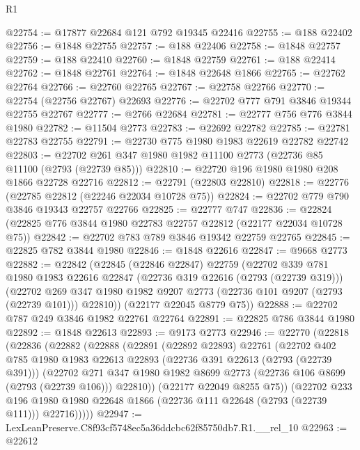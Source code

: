 \begin{lexlean}{R1}
\begin{coremodule}
@22754 := @17877 @22684 @121 @792 @19345 @22416
@22755 := @188 @22402
@22756 := @1848 @22755
@22757 := @188 @22406
@22758 := @1848 @22757
@22759 := @188 @22410
@22760 := @1848 @22759
@22761 := @188 @22414
@22762 := @1848 @22761
@22764 := @1848 @22648 @1866
@22765 := @22762 @22764
@22766 := @22760 @22765
@22767 := @22758 @22766
@22770 := @22754 (@22756 @22767) @22693
@22776 := @22702 @777 @791 @3846 @19344 @22755 @22767
@22777 := @2766 @22684
@22781 := @22777 @756 @776 @3844 @1980
@22782 := @11504 @2773
@22783 := @22692 @22782
@22785 := @22781 @22783 @22755
@22791 := @22730 @775 @1980 @1983 @22619 @22782 @22742
@22803 := @22702 @261 @347 @1980 @1982 @11100 @2773 (@22736 @85 @11100 (@2793 (@22739 @85)))
@22810 := @22720 @196 @1980 @1980 @208 @1866 @22728 @22716
@22812 := @22791 (@22803 @22810)
@22818 := @22776 (@22785 @22812 (@22246 @22034 @10728 @75))
@22824 := @22702 @779 @790 @3846 @19343 @22757 @22766
@22825 := @22777 @747
@22836 := @22824 (@22825 @776 @3844 @1980 @22783 @22757 @22812 (@22177 @22034 @10728 @75))
@22842 := @22702 @783 @789 @3846 @19342 @22759 @22765
@22845 := @22825 @782 @3844 @1980
@22846 := @1848 @22616
@22847 := @9668 @2773
@22882 := @22842
    (@22845
      (@22846 @22847)
      @22759
      (@22702
        @339
        @781
        @1980
        @1983
        @22616
        @22847
        (@22736 @319 @22616 (@2793 (@22739 @319)))
        (@22702 @269 @347 @1980 @1982 @9207 @2773 (@22736 @101 @9207 (@2793 (@22739 @101))) @22810))
      (@22177 @22045 @8779 @75))
@22888 := @22702 @787 @249 @3846 @1982 @22761 @22764
@22891 := @22825 @786 @3844 @1980
@22892 := @1848 @22613
@22893 := @9173 @2773
@22946 := @22770
    (@22818
      (@22836
        (@22882
          (@22888
            (@22891
              (@22892 @22893)
              @22761
              (@22702
                @402
                @785
                @1980
                @1983
                @22613
                @22893
                (@22736 @391 @22613 (@2793 (@22739 @391)))
                (@22702
                  @271
                  @347
                  @1980
                  @1982
                  @8699
                  @2773
                  (@22736 @106 @8699 (@2793 (@22739 @106)))
                  @22810))
              (@22177 @22049 @8255 @75))
            (@22702
              @233
              @196
              @1980
              @1980
              @22648
              @1866
              (@22736 @111 @22648 (@2793 (@22739 @111)))
              @22716)))))
@22947 := LexLeanPreserve.C8f93cf5748ec5a36ddcbc62f85750db7.R1.__rel_10
@22963 := @22612

\end{coremodule}
\end{lexlean}
